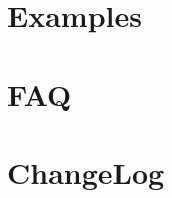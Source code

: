 \documentclass{book}
\begin{document}
\begin{schemeregion}
\chapter{Examples}

\hypertarget{examples}{}



\chapter{FAQ}



\chapter{ChangeLog}



\end{schemeregion}

\printindex
\end{document}
